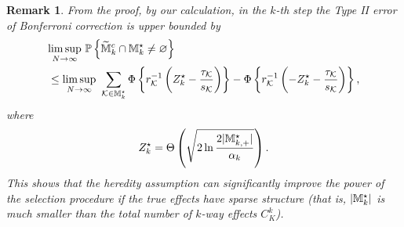 \documentclass[12pt]{article}
\newtheorem{remark}{Remark}
\begin{document}
\begin{remark}
From the proof, by our calculation, in the $k$-th step the Type II error of Bonferroni correction is upper bounded by 
\begin{align*}
        &\underset{N\to\infty}{\lim\sup}~{\mathbb{P}}\left\{\widetilde{{\mathbb{M}}}^c_{k}\cap{\mathbb{M}}^{\star }_k\neq \varnothing\right\} \notag\\
        & \le \underset{N\to\infty}{\lim\sup}~\sum_{{\mathcal{K}}\in{\mathbb{M}}_k^\star} \Phi\left\{r_{{\mathcal{K}}}^{-1}\left(Z_k^\star - \frac{\tau_{\mathcal{K}}}{s_{\mathcal{K}}}\right)\right\} - \Phi\left\{r_{{\mathcal{K}}}^{-1}\left(-Z_k^\star - \frac{\tau_{\mathcal{K}}}{s_{\mathcal{K}}}\right)\right\},
\end{align*}
where
\begin{align*}
    Z_k^\star =  \Theta\left(\sqrt{2\ln\frac{2|{\mathbb{M}}_{k,+}^\star|}{\alpha_k}}\right). 
\end{align*}
This shows that the heredity assumption can significantly improve the power of the selection procedure if the true effects have sparse structure (that is, $|{\mathbb{M}}_k^\star|$ is much smaller than the total number of $k$-way effects $C_K^k$).  
\end{remark}
\end{document}
